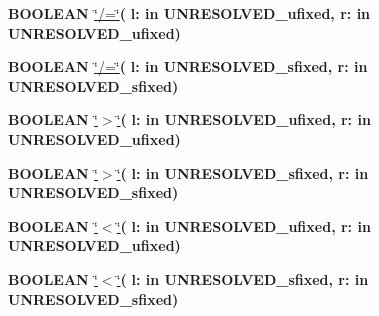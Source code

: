 \begin{DoxyCompactItemize}
{\bfseries {\bfseries \textcolor{comment}{B\+O\+O\+L\+E\+A\+N}\textcolor{vhdlchar}{ }}} \hyperlink{class__fixed__pkg_a24c7f496c9f427dec65fd0b1ce9cd4bf}{\char`\"{}/=\char`\"{}}{\bfseries  ( }{\bfseries \textcolor{vhdlchar}{l\+: }\textcolor{stringliteral}{in }\textcolor{vhdlchar}{U\+N\+R\+E\+S\+O\+L\+V\+E\+D\+\_\+ufixed}}{\bfseries  , \textcolor{vhdlchar}{r\+: }\textcolor{stringliteral}{in }\textcolor{vhdlchar}{U\+N\+R\+E\+S\+O\+L\+V\+E\+D\+\_\+ufixed}}{\bfseries  )} 
\item 
{\bfseries {\bfseries \textcolor{comment}{B\+O\+O\+L\+E\+A\+N}\textcolor{vhdlchar}{ }}} \hyperlink{class__fixed__pkg_a24c7f496c9f427dec65fd0b1ce9cd4bf}{\char`\"{}/=\char`\"{}}{\bfseries  ( }{\bfseries \textcolor{vhdlchar}{l\+: }\textcolor{stringliteral}{in }\textcolor{vhdlchar}{U\+N\+R\+E\+S\+O\+L\+V\+E\+D\+\_\+sfixed}}{\bfseries  , \textcolor{vhdlchar}{r\+: }\textcolor{stringliteral}{in }\textcolor{vhdlchar}{U\+N\+R\+E\+S\+O\+L\+V\+E\+D\+\_\+sfixed}}{\bfseries  )} 
\item 
{\bfseries {\bfseries \textcolor{comment}{B\+O\+O\+L\+E\+A\+N}\textcolor{vhdlchar}{ }}} \hyperlink{class__fixed__pkg_a3f54aa011a999eaf960a459e00088995}{\char`\"{}$>$\char`\"{}}{\bfseries  ( }{\bfseries \textcolor{vhdlchar}{l\+: }\textcolor{stringliteral}{in }\textcolor{vhdlchar}{U\+N\+R\+E\+S\+O\+L\+V\+E\+D\+\_\+ufixed}}{\bfseries  , \textcolor{vhdlchar}{r\+: }\textcolor{stringliteral}{in }\textcolor{vhdlchar}{U\+N\+R\+E\+S\+O\+L\+V\+E\+D\+\_\+ufixed}}{\bfseries  )} 
\item 
{\bfseries {\bfseries \textcolor{comment}{B\+O\+O\+L\+E\+A\+N}\textcolor{vhdlchar}{ }}} \hyperlink{class__fixed__pkg_a3f54aa011a999eaf960a459e00088995}{\char`\"{}$>$\char`\"{}}{\bfseries  ( }{\bfseries \textcolor{vhdlchar}{l\+: }\textcolor{stringliteral}{in }\textcolor{vhdlchar}{U\+N\+R\+E\+S\+O\+L\+V\+E\+D\+\_\+sfixed}}{\bfseries  , \textcolor{vhdlchar}{r\+: }\textcolor{stringliteral}{in }\textcolor{vhdlchar}{U\+N\+R\+E\+S\+O\+L\+V\+E\+D\+\_\+sfixed}}{\bfseries  )} 
\item 
{\bfseries {\bfseries \textcolor{comment}{B\+O\+O\+L\+E\+A\+N}\textcolor{vhdlchar}{ }}} \hyperlink{class__fixed__pkg_a5ad3a07264d5124001ca2ebc7d7257b3}{\char`\"{}$<$\char`\"{}}{\bfseries  ( }{\bfseries \textcolor{vhdlchar}{l\+: }\textcolor{stringliteral}{in }\textcolor{vhdlchar}{U\+N\+R\+E\+S\+O\+L\+V\+E\+D\+\_\+ufixed}}{\bfseries  , \textcolor{vhdlchar}{r\+: }\textcolor{stringliteral}{in }\textcolor{vhdlchar}{U\+N\+R\+E\+S\+O\+L\+V\+E\+D\+\_\+ufixed}}{\bfseries  )} 
\item 
{\bfseries {\bfseries \textcolor{comment}{B\+O\+O\+L\+E\+A\+N}\textcolor{vhdlchar}{ }}} \hyperlink{class__fixed__pkg_a5ad3a07264d5124001ca2ebc7d7257b3}{\char`\"{}$<$\char`\"{}}{\bfseries  ( }{\bfseries \textcolor{vhdlchar}{l\+: }\textcolor{stringliteral}{in }\textcolor{vhdlchar}{U\+N\+R\+E\+S\+O\+L\+V\+E\+D\+\_\+sfixed}}{\bfseries  , \textcolor{vhdlchar}{r\+: }\textcolor{stringliteral}{in }\textcolor{vhdlchar}{U\+N\+R\+E\+S\+O\+L\+V\+E\+D\+\_\+sfixed}}{\bfseries  )} 

\end{DoxyCompactItemize}
